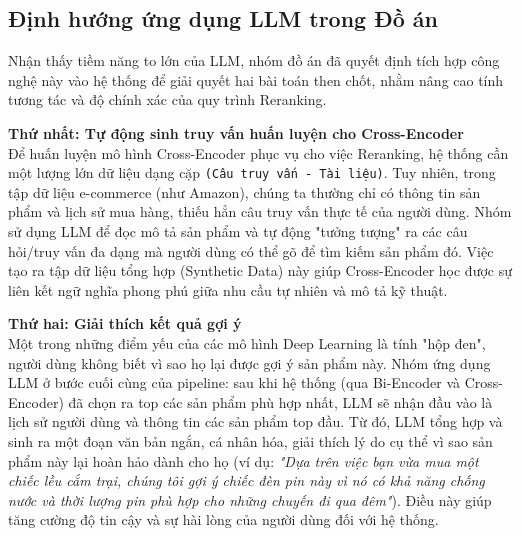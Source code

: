 \subsection{Định hướng ứng dụng LLM trong Đồ án}

Nhận thấy tiềm năng to lớn của LLM, nhóm đồ án đã quyết định tích hợp công nghệ này vào hệ thống để giải quyết hai bài toán then chốt, nhằm nâng cao tính tương tác và độ chính xác của quy trình Reranking.

\textbf{Thứ nhất: Tự động sinh truy vấn huấn luyện cho Cross-Encoder} \\
Để huấn luyện mô hình Cross-Encoder phục vụ cho việc Reranking, hệ thống cần một lượng lớn dữ liệu dạng cặp \texttt{(Câu truy vấn - Tài liệu)}. Tuy nhiên, trong tập dữ liệu e-commerce (như Amazon), chúng ta thường chỉ có thông tin sản phẩm và lịch sử mua hàng, thiếu hẳn câu truy vấn thực tế của người dùng. Nhóm sử dụng LLM để đọc mô tả sản phẩm và tự động "tưởng tượng" ra các câu hỏi/truy vấn đa dạng mà người dùng có thể gõ để tìm kiếm sản phẩm đó. Việc tạo ra tập dữ liệu tổng hợp (Synthetic Data) này giúp Cross-Encoder học được sự liên kết ngữ nghĩa phong phú giữa nhu cầu tự nhiên và mô tả kỹ thuật.

\textbf{Thứ hai: Giải thích kết quả gợi ý} \\
Một trong những điểm yếu của các mô hình Deep Learning là tính "hộp đen", người dùng không biết vì sao họ lại được gợi ý sản phẩm này. Nhóm ứng dụng LLM ở bước cuối cùng của pipeline: sau khi hệ thống (qua Bi-Encoder và Cross-Encoder) đã chọn ra top các sản phẩm phù hợp nhất, LLM sẽ nhận đầu vào là lịch sử người dùng và thông tin các sản phẩm top đầu. Từ đó, LLM tổng hợp và sinh ra một đoạn văn bản ngắn, cá nhân hóa, giải thích lý do cụ thể vì sao sản phẩm này lại hoàn hảo dành cho họ (ví dụ: \textit{"Dựa trên việc bạn vừa mua một chiếc lều cắm trại, chúng tôi gợi ý chiếc đèn pin này vì nó có khả năng chống nước và thời lượng pin phù hợp cho những chuyến đi qua đêm"}). Điều này giúp tăng cường độ tin cậy và sự hài lòng của người dùng đối với hệ thống.